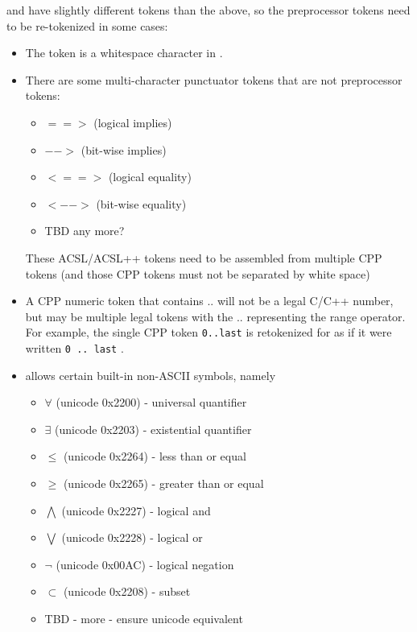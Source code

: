 \acsl and \acslpp have slightly different tokens than the above, so the preprocessor tokens need to be re-tokenized in some cases:
\begin{itemize}
	\item The \@ token is a whitespace character in \acslb.
	\item There are some \acslb multi-character punctuator tokens that are not
	preprocessor tokens:
	\begin{itemize}
		\item[] $==>$ (logical implies)
		\item[] $-->$ (bit-wise implies)
		\item[] $<==>$ (logical equality)
		\item[] $<-->$ (bit-wise equality)
		\item[] TBD any more?
	\end{itemize}
	These ACSL/ACSL++ tokens need to be assembled from multiple CPP tokens (and those CPP tokens must not be separated by white space)
	\item A CPP numeric token that contains .. will not be a legal C/C++ number, but may be multiple legal \acslb tokens with the .. representing the range operator.  For example, the single CPP token \texttt{0..last} is retokenized for \acslb as if it were written \texttt{0 .. last} .
	\item \acslb allows certain built-in non-ASCII symbols, namely
	\begin{itemize}
		\item[] $\forall$ (unicode 0x2200) - universal quantifier
		\item[] $\exists$ (unicode 0x2203) - existential quantifier
		\item[] $\leq$ (unicode 0x2264) - less than or equal
		\item[] $\geq$ (unicode 0x2265) - greater than or equal
		\item[] $\bigwedge$ (unicode 0x2227) - logical and
		\item[] $\bigvee$ (unicode 0x2228) - logical or
		\item[] $\neg$ (unicode 0x00AC) - logical negation
		\item[] $\subset$ (unicode 0x2208) - subset
		\item TBD - more - ensure unicode equivalent
	\end{itemize}
\end{itemize}

